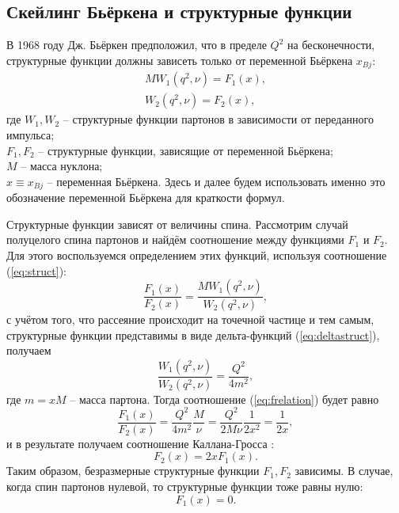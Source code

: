 \documentclass{extarticle}
\begin{document}
\subsection{Скейлинг Бьёркена и структурные функции}

В 1968 году Дж. Бьёркен предположил, что в пределе $Q^2$ на бесконечности, структурные функции должны зависеть только от переменной Бьёркена $x_{Bj}$:
\begin{equation}
	\begin{split}
	MW_1(q^2, \nu) = F_1 (x) ,\\
	W_2(q^2, \nu) = F_2(x),
	\end{split}
	\label{eq:struct}
\end{equation}
где  $W_1, W_2$ -- структурные функции партонов в зависимости от переданного импульса; \\ $F_1, F_2$ -- структурные функции, зависящие от переменной Бьёркена; \\ $M$ -- масса нуклона; \\ $x \equiv x_{Bj}$ -- переменная Бьёркена. Здесь и далее будем использовать именно это обозначение переменной Бьёркена для краткости формул.

Структурные функции зависят от величины спина. Рассмотрим случай полуцелого спина партонов и найдём соотношение между функциями $F_1$ и $F_2$. Для этого воспользуемся определением этих функций, используя соотношение (\ref{eq:struct}):
\begin{equation}
	\frac{F_1(x)}{F_2(x)} = \frac{MW_1(q^2, \nu)}{W_2(q^2, \nu)},
	\label{eq:frelation}
\end{equation}
с учётом того, что рассеяние происходит на точечной частице и тем самым, структурные функции представимы в виде дельта-функций (\ref{eq:deltastruct}), получаем
\begin{equation}
	\frac{W_1(q^2, \nu)}{W_2(q^2, \nu)} = \frac{Q^2}{4m^2},
\end{equation}
где $m = xM$ -- масса партона. Тогда соотношение (\ref{eq:frelation}) будет равно
\begin{equation}
	\frac{F_1(x)}{F_2(x)} =  \frac{Q^2}{4m^2} \frac{M}{\nu} =  \frac{Q^2}{2M\nu} \frac{1}{2x^2} = \frac{1}{2x},
\end{equation}
и в результате получаем соотношение Каллана-Гросса \cite{Callan-Gross}:
\begin{equation}
		F_2(x) = 2xF_1(x).
\end{equation}
Таким образом, безразмерные структурные функции $F_1, F_2$ зависимы. В случае, когда спин партонов нулевой, то структурные функции тоже равны нулю:
\begin{equation}
	F_1 (x) = 0.
\end{equation}
\end{document}
